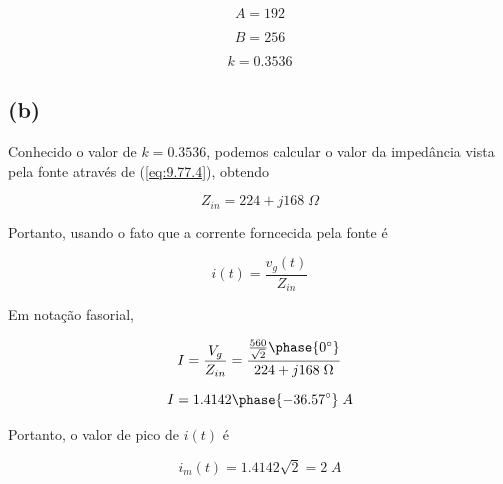 \documentclass[12pt]{scrartcl}
\begin{document}
    \[ A = 192 \]

    \[ B = 256 \]

    \[ \boxed{k = 0.3536} \]

    \subsection*{(b)}

    Conhecido o valor de \(k = 0.3536\), podemos calcular o valor da impedância vista pela fonte através de (\ref{eq:9.77.4}), obtendo

    \[ Z_{in} = 224 + j168 \; \Omega \]

    Portanto, usando o fato que a corrente forncecida pela fonte é 

    \[ i(t) = \frac{v_g(t)}{Z_{in}} \]

    Em notação fasorial,

    \[ I = \frac{V_g}{Z_{in}} = \frac{\frac{560}{\sqrt{2}}\phase{0^{\circ}}}{224 + j168 \; \Omega} \]

    \[ I = 1.4142\phase{-36.57^{\circ}} \; A \]

    Portanto, o valor de pico de \(i(t)\) é

    \[ \boxed{i_m(t) = 1.4142 \sqrt{2} = 2 \; A}  \]


\end{document}
